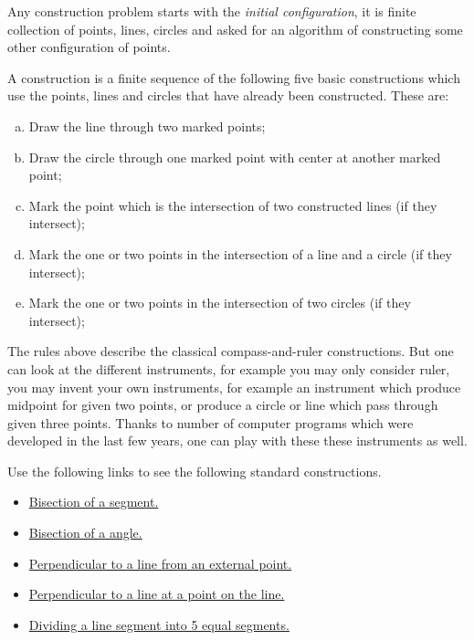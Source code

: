 Any construction problem starts with the \emph{initial configuration},
it is finite collection of points, lines, circles
and asked for an algorithm of constructing some other configuration of points.

A construction is a finite sequence of the following five basic constructions which use the points, lines and circles that have already been constructed. 
These are:
\begin{enumerate}[(a)]
\item Draw the line through two marked points;
\item Draw the circle through one marked point with center at another marked point;
\item Mark the point which is the intersection of two constructed lines (if they intersect);
\item Mark the one or two points in the intersection of a line and a circle (if they intersect);
\item Mark the one or two points in the intersection of two circles (if they intersect);
\end{enumerate}

The rules above describe the classical compass-and-ruler constructions. 
But one can look at the different instruments, for example
you may only consider ruler,
you may invent your own instruments, for example an instrument which produce midpoint for given two points, or produce a circle or line which pass through given three points.
Thanks to number of computer programs which were developed in the last few years, one can play with these these instruments as well. 


Use the following links to see the following standard constructions.
\begin{itemize}
\item \href{run:./car/segment-bisector.html}{Bisection of a segment.}
\item \href{run:./car/angle-bisector.html}{Bisection of a angle.}
\item \href{run:./car/perpendicular-1.html}{Perpendicular to a line from an external point.}
\item \href{run:./car/perpendicular-2.html}{Perpendicular to a line at a point on the line.}
\item \href{run:./car/5-sect.html}{Dividing a line segment into 5 equal segments.}
\end{itemize}

